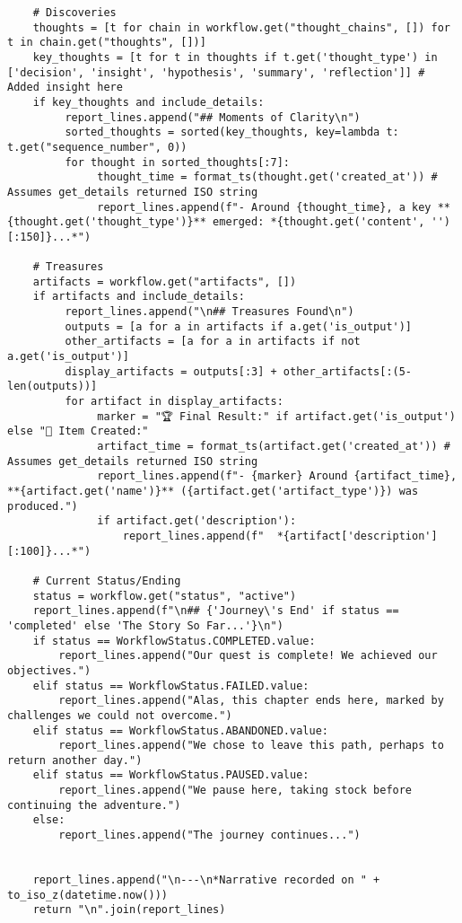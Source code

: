 \documentclass[12pt,a4paper]{article}
\begin{document}
\begin{pageablecode}
\begin{verbatim}
    # Discoveries
    thoughts = [t for chain in workflow.get("thought_chains", []) for t in chain.get("thoughts", [])]
    key_thoughts = [t for t in thoughts if t.get('thought_type') in ['decision', 'insight', 'hypothesis', 'summary', 'reflection']] # Added insight here
    if key_thoughts and include_details:
         report_lines.append("## Moments of Clarity\n")
         sorted_thoughts = sorted(key_thoughts, key=lambda t: t.get("sequence_number", 0))
         for thought in sorted_thoughts[:7]:
              thought_time = format_ts(thought.get('created_at')) # Assumes get_details returned ISO string
              report_lines.append(f"- Around {thought_time}, a key **{thought.get('thought_type')}** emerged: *{thought.get('content', '')[:150]}...*")

    # Treasures
    artifacts = workflow.get("artifacts", [])
    if artifacts and include_details:
         report_lines.append("\n## Treasures Found\n")
         outputs = [a for a in artifacts if a.get('is_output')]
         other_artifacts = [a for a in artifacts if not a.get('is_output')]
         display_artifacts = outputs[:3] + other_artifacts[:(5-len(outputs))]
         for artifact in display_artifacts:
              marker = "🏆 Final Result:" if artifact.get('is_output') else "📌 Item Created:"
              artifact_time = format_ts(artifact.get('created_at')) # Assumes get_details returned ISO string
              report_lines.append(f"- {marker} Around {artifact_time}, **{artifact.get('name')}** ({artifact.get('artifact_type')}) was produced.")
              if artifact.get('description'):
                  report_lines.append(f"  *{artifact['description'][:100]}...*")

    # Current Status/Ending
    status = workflow.get("status", "active")
    report_lines.append(f"\n## {'Journey\'s End' if status == 'completed' else 'The Story So Far...'}\n")
    if status == WorkflowStatus.COMPLETED.value:
        report_lines.append("Our quest is complete! We achieved our objectives.")
    elif status == WorkflowStatus.FAILED.value:
        report_lines.append("Alas, this chapter ends here, marked by challenges we could not overcome.")
    elif status == WorkflowStatus.ABANDONED.value:
        report_lines.append("We chose to leave this path, perhaps to return another day.")
    elif status == WorkflowStatus.PAUSED.value: 
        report_lines.append("We pause here, taking stock before continuing the adventure.")
    else: 
        report_lines.append("The journey continues...")


    report_lines.append("\n---\n*Narrative recorded on " + to_iso_z(datetime.now()))
    return "\n".join(report_lines)


\end{verbatim}
\end{pageablecode}
\end{document}

